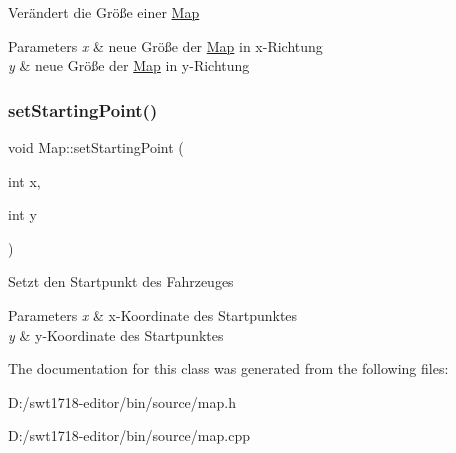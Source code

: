 Verändert die Größe einer \mbox{\hyperlink{class_map}{Map}} 
\begin{DoxyParams}{Parameters}
{\em x} & neue Größe der \mbox{\hyperlink{class_map}{Map}} in x-\/\+Richtung \\
\hline
{\em y} & neue Größe der \mbox{\hyperlink{class_map}{Map}} in y-\/\+Richtung \\
\hline
\end{DoxyParams}
\mbox{\label{class_map_ab4fe2e5f95e7fd16f028a0ffe1db8917}} 
\subsubsection{\texorpdfstring{set\+Starting\+Point()}{setStartingPoint()}}
{\footnotesize\ttfamily void Map\+::set\+Starting\+Point (\begin{DoxyParamCaption}\item[{int}]{x,  }\item[{int}]{y }\end{DoxyParamCaption})}

Setzt den Startpunkt des Fahrzeuges 
\begin{DoxyParams}{Parameters}
{\em x} & x-\/\+Koordinate des Startpunktes \\
\hline
{\em y} & y-\/\+Koordinate des Startpunktes \\
\hline
\end{DoxyParams}


The documentation for this class was generated from the following files\+:\begin{DoxyCompactItemize}
\item 
D\+:/swt1718-\/editor/bin/source/map.\+h\item 
D\+:/swt1718-\/editor/bin/source/map.\+cpp\end{DoxyCompactItemize}
